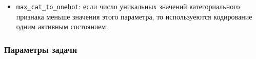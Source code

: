 \documentclass[%
	11pt,
	a4paper,
	utf8,
		]{article}
\begin{document}
\begin{itemize}
\begin{lstlisting}[
style = ironpython,
numbers = none
]
	wtrain = dtrain.get_weight()
	wtest = dtest.get_weight()
	
	# Нужно еще пересчитать веса экземпляров для обучающего и тестового набора!!!
	sum_weight = sum(wtrain) + sum(wtest)
	wtrain *= sum_weight / sum(wtrain)
	wtest *= sum_wight / sum(wtest)
	
	dtrain.set_weight(wtrain)
	dtest.set_weight(wtest)
	
	return (dtrain, dtest, param)

# do cross validation, for each fold
# the (dtrain, dtest, param) will be passed into fpreproc
# then the return value of fpreproc will be used to generate
# results of that fold
xgb.cv(
    param,
    dtrain,
    num_round,
    nfold=5,
    metric={"auc"},
    seed=0,
    fpreproc=fpreproc
)
\end{lstlisting}

    \item \verb|max_cat_to_onehot|: если число уникальных значений категориального признака меньше значения этого параметра, то используеются кодирование одним активным состоянием.
\end{itemize}

\subsubsection{Параметры задачи}
\end{document}
